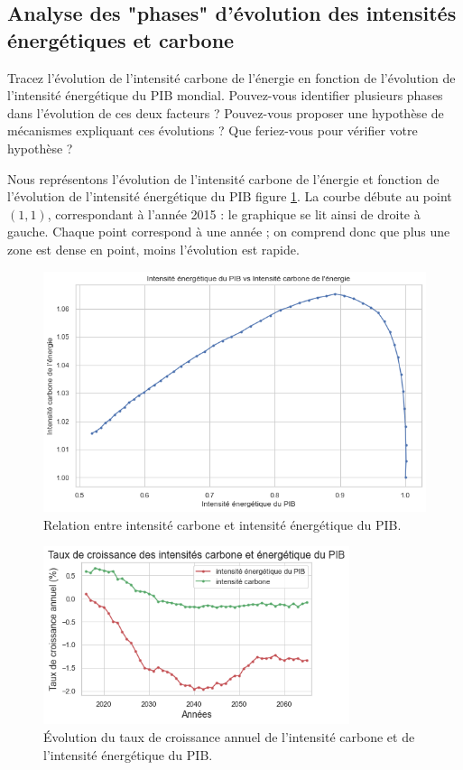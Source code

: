 \documentclass[a4,11pt]{aleph-notas}
\newcommand{\ans}[1]{
\begin{mdframed}[
    roundcorner=10pt,     %
    backgroundcolor=gray!20, %
    linecolor=black,      %
    linewidth=1pt,        %
    innertopmargin=10pt,  %
    innerbottommargin=10pt, %
    innerleftmargin=10pt,  %
    innerrightmargin=10pt  %
]
#1
\end{mdframed}
}
\begin{document}
\subsection{Analyse des "phases" d'évolution des intensités énergétiques et carbone}

\ans{Tracez l’évolution de l’intensité carbone de l’énergie en fonction de l’évolution de l’intensité énergétique du PIB mondial. Pouvez-vous identifier plusieurs phases dans l’évolution de ces deux facteurs ? Pouvez-vous proposer une hypothèse de mécanismes expliquant ces évolutions ? Que feriez-vous pour vérifier votre hypothèse ?}

Nous représentons l’évolution de l’intensité carbone de l’énergie et fonction de l’évolution de l’intensité énergétique du PIB figure \ref{fig:intensites}. La courbe débute au point $(1,1)$, correspondant à l'année 2015 : le graphique se lit ainsi de droite à gauche. Chaque point correspond à une année ; on comprend donc que plus une zone est dense en point, moins l'évolution est rapide.

\begin{figure}[H]
    \centering
    \includegraphics[width=\textwidth]{images_IMACLIM/intensites_baseline.png}
    \caption{Relation entre intensité carbone et intensité énergétique du PIB.}
    \label{fig:intensites}
\end{figure}

\begin{figure}[H]
    \centering
    \includegraphics[width=0.8\textwidth]{images_IMACLIM/croissance_intensites.png}
    \caption{Évolution du taux de croissance annuel de l'intensité carbone et de l'intensité énergétique du PIB.}
    \label{fig:croissance_intensites}
\end{figure}
\end{document}
